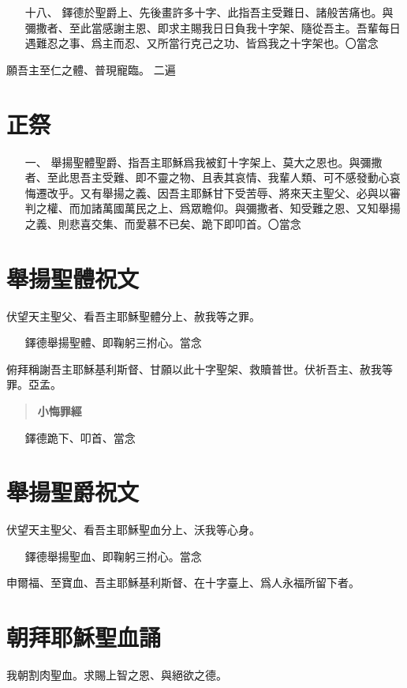 \begin{enumerate}
    \item[十八、]{\small 鐸德於聖爵上、先後畫許多十字、此指吾主受難日、諸般苦痛也。與彌撒者、至此當感謝主恩、即求主賜我日日負我十字架、隨從吾主。吾輩每日遇難忍之事、爲主而忍、又所當行克己之功、皆爲我之十字架也。〇當念} 
\end{enumerate}
願吾主至仁之體、普現寵臨。 {\small 二遍}

\section{正祭}
\begin{enumerate}
    \item[一、]{\small 舉揚聖體聖爵、指吾主耶穌爲我被釘十字架上、莫大之恩也。與彌撒者、至此思吾主受難、即不靈之物、且表其哀情、我輩人類、可不感發動心哀悔遷改乎。又有舉揚之義、因吾主耶穌甘下受苦辱、將來天主聖父、必與以審判之權、而加諸萬國萬民之上、爲眾瞻仰。與彌撒者、知受難之恩、又知舉揚之義、則悲喜交集、而愛慕不已矣、跪下即叩首。〇當念}
\end{enumerate}
\section*{舉揚聖體祝文}
伏望天主聖父、看吾主耶穌聖體分上、赦我等之罪。
\begin{enumerate}
    \item[]{\small 鐸德舉揚聖體、即鞠躬三拊心。當念}
\end{enumerate}
俯拜稱謝吾主耶穌基利斯督、甘願以此十字聖架、救贖普世。伏祈吾主、赦我等罪。{\cspace}亞孟。
\begin{quote}
    \bfseries 小悔罪經
\end{quote}
\begin{enumerate}
    \item[]{\small 鐸德跪下、叩首、當念}
\end{enumerate}
\section*{舉揚聖爵祝文}
伏望天主聖父、看吾主耶穌聖血分上、沃我等心身。
\begin{enumerate}
    \item[]{\small 鐸德舉揚聖血、即鞠躬三拊心。當念}
\end{enumerate}
申爾福、至寶血、吾主耶穌基利斯督、在十字臺上、爲人永福所留下者。
\section*{朝拜耶穌聖血誦}
我朝割肉聖血。求賜上智之恩、與絕欲之德。

